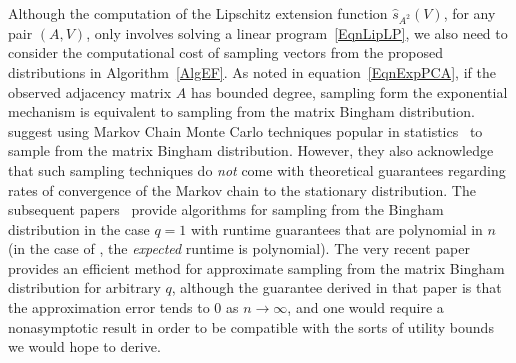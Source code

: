 \documentclass{article}
\begin{document}
Although the computation of the Lipschitz extension function $\widehat{s}_{A^2}(V)$, for any pair $(A,V)$, only involves solving a linear program~\eqref{EqnLipLP}, we also need to consider the computational cost of sampling vectors from the proposed distributions in Algorithm~\ref{AlgEF}. As noted in equation~\eqref{EqnExpPCA}, if the observed adjacency matrix $A$ has bounded degree, sampling form the exponential mechanism is equivalent to sampling from the matrix Bingham distribution. \cite{ChaEtal13} suggest using Markov Chain Monte Carlo techniques popular in statistics~\cite{hoff2009simulation} to sample from the matrix Bingham distribution. However, they also acknowledge that such sampling techniques do \emph{not} come with theoretical guarantees regarding rates of convergence of the Markov chain to the stationary distribution. The subsequent papers~\cite{kapralov2013differentially, ge2021efficient} provide algorithms for sampling from the Bingham distribution in the case $q=1$ with runtime guarantees that are polynomial in $n$ (in the case of \cite{ge2021efficient}, the \emph{expected} runtime is polynomial). The very recent paper~\cite{yun2025high} provides an efficient method for approximate sampling from the matrix Bingham distribution for arbitrary $q$, although the guarantee derived in that paper is that the approximation error tends to 0 as $n \rightarrow \infty$, and one would require a nonasymptotic result in order to be compatible with the sorts of utility bounds we would hope to derive.
\end{document}
